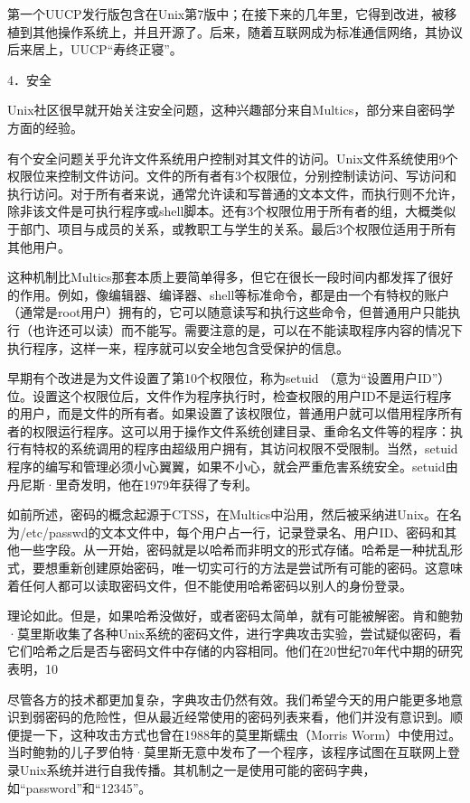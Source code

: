 \documentclass[a4paper,12pt,UTF8,twoside]{ctexbook}
\begin{document}
{{第一个UUCP发行版包含在Unix第7版中；在接下来的几年里，它得到改进，被移植到其他操作系统上，并且开源了。后来，随着互联网成为标准通信网络，其协议后来居上，UUCP“寿终正寝”。





4．安全


Unix社区很早就开始关注安全问题，这种兴趣部分来自Multics，部分来自密码学方面的经验。

有个安全问题关乎允许文件系统用户控制对其文件的访问。Unix文件系统使用9个权限位来控制文件访问。文件的所有者有3个权限位，分别控制读访问、写访问和执行访问。对于所有者来说，通常允许读和写普通的文本文件，而执行则不允许，除非该文件是可执行程序或shell脚本。还有3个权限位用于所有者的组，大概类似于部门、项目与成员的关系，或教职工与学生的关系。最后3个权限位适用于所有其他用户。

这种机制比Multics那套本质上要简单得多，但它在很长一段时间内都发挥了很好的作用。例如，像编辑器、编译器、shell等标准命令，都是由一个有特权的账户（通常是root用户）拥有的，它可以随意读写和执行这些命令，但普通用户只能执行（也许还可以读）而不能写。需要注意的是，可以在不能读取程序内容的情况下执行程序，这样一来，程序就可以安全地包含受保护的信息。

早期有个改进是为文件设置了第10个权限位，称为setuid （意为“设置用户ID”）位。设置这个权限位后，文件作为程序执行时，检查权限的用户ID不是运行程序的用户，而是文件的所有者。如果设置了该权限位，普通用户就可以借用程序所有者的权限运行程序。这可以用于操作文件系统创建目录、重命名文件等的程序：执行有特权的系统调用的程序由超级用户拥有，其访问权限不受限制。当然，setuid程序的编写和管理必须小心翼翼，如果不小心，就会严重危害系统安全。setuid由丹尼斯·里奇发明，他在1979年获得了专利。

如前所述，密码的概念起源于CTSS，在Multics中沿用，然后被采纳进Unix。在名为/etc/passwd的文本文件中，每个用户占一行，记录登录名、用户ID、密码和其他一些字段。从一开始，密码就是以哈希而非明文的形式存储。哈希是一种扰乱形式，要想重新创建原始密码，唯一切实可行的方法是尝试所有可能的密码。这意味着任何人都可以读取密码文件，但不能使用哈希密码以别人的身份登录。

理论如此。但是，如果哈希没做好，或者密码太简单，就有可能被解密。肯和鲍勃·莫里斯收集了各种Unix系统的密码文件，进行字典攻击实验，尝试疑似密码，看它们哈希之后是否与密码文件中存储的内容相同。他们在20世纪70年代中期的研究表明，10%

尽管各方的技术都更加复杂，字典攻击仍然有效。我们希望今天的用户能更多地意识到弱密码的危险性，但从最近经常使用的密码列表来看，他们并没有意识到。顺便提一下，这种攻击方式也曾在1988年的莫里斯蠕虫（Morris Worm）中使用过。当时鲍勃的儿子罗伯特·莫里斯无意中发布了一个程序，该程序试图在互联网上登录Unix系统并进行自我传播。其机制之一是使用可能的密码字典，如“password”和“12345”。

}}
\end{document}

